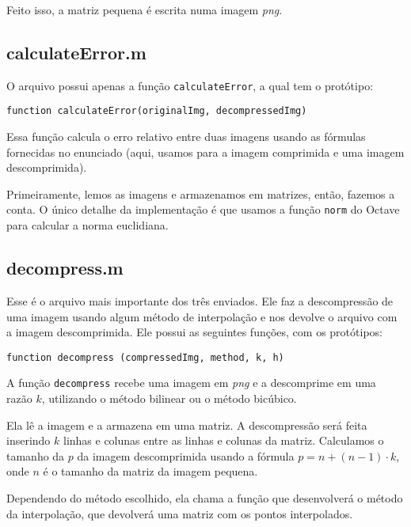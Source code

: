 \documentclass[12pt,letterpaper]{article}
\begin{document}
	Feito isso, a matriz pequena é escrita numa imagem \textit{png}.

	\subsection{calculateError.m}
	
	O arquivo possui apenas a função \texttt{calculateError}, a qual tem o protótipo:
	
	\begin{center}
		\texttt{function calculateError(originalImg, decompressedImg)}
	\end{center}
	
	Essa função calcula o erro relativo entre duas imagens usando as fórmulas fornecidas no enunciado (aqui, usamos para a imagem comprimida e uma imagem descomprimida).
	
	\clearpage
	
	Primeiramente, lemos as imagens e armazenamos em matrizes, então, fazemos a conta. O único detalhe da implementação é que usamos a função \texttt{norm} do Octave para calcular a norma euclidiana.
	
	\subsection{decompress.m}
	
	Esse é o arquivo mais importante dos três enviados. Ele faz a descompressão de uma imagem usando algum método de interpolação e nos devolve o arquivo com a imagem descomprimida. Ele possui as seguintes funções, com os protótipos:
	
	\begin{center}
		\texttt{function decompress (compressedImg, method, k, h)}
	\end{center}
	
	A função \texttt{decompress} recebe uma imagem em \textit{png} e a descomprime em uma razão $k$, utilizando o método bilinear ou o método bicúbico.
	
	Ela lê a imagem e a armazena em uma matriz. A descompressão será feita inserindo $k$ linhas e colunas entre as linhas e colunas da matriz. Calculamos o tamanho da $p$ da imagem descomprimida usando a fórmula $p = n+(n-1)\cdot k$, onde $n$ é o tamanho da matriz da imagem pequena.
	
	Dependendo do método escolhido, ela chama a função que desenvolverá o método da interpolação, que devolverá uma matriz com os pontos interpolados.
	
\end{document}
